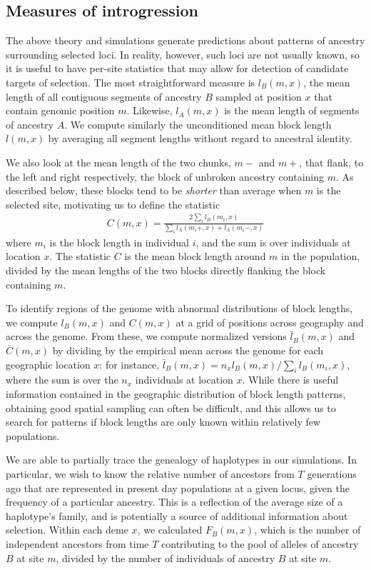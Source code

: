 \documentclass[11pt,letterpaper]{article}
\begin{document}
\subsection*{Measures of introgression}


The above theory and simulations generate predictions about patterns of ancestry surrounding selected loci. 
In reality, however, such loci are not usually known, so it is useful to have per-site statistics that may allow for detection of candidate targets of selection. 
The most straightforward measure is $l_B(m,x)$,  
the mean length of all contiguous segments of ancestry $B$ sampled at position $x$ that contain genomic position $m$.
Likewise, $l_A(m,x)$ is the mean length of segments of ancestry $A$.
We compute similarly the unconditioned mean block length $l(m,x)$
by averaging all segment lengths without regard to ancestral identity.

We also look at the mean length of the two chunks, $m-$ and $m+$, that flank, to the left and right respectively, 
the block of unbroken ancestry containing $m$. 
As described below, these blocks tend to be \emph{shorter} than average when $m$ is the selected site,
motivating us to define the statistic
\begin{align}
     C(m,x) =  \frac{2\sum_i{l_B(m_i,x)}}{\sum_i{l_A(m_i+,x)+l_A(m_i-,x)}}
\end{align}
where $m_i$ is the block length in individual $i$, and the sum is over individuals at location $x$.
The statistic $C$ is the mean block length around $m$ in the population, 
divided by the mean lengths of the two blocks directly flanking the block containing $m$. 

To identify regions of the genome with abnormal distributions of block lengths, 
we compute $l_B(m,x)$ and $C(m,x)$ at a grid of positions across geography and across the genome. 
From these, we compute normalized versions $\bar l_B(m,x)$ and $\bar C(m,x)$
by dividing by the empirical mean across the genome for each geographic location $x$:
for instance, $\bar l_B(m,x) = n_x l_B(m,x)/\sum_i l_B(m_i,x)$,
where the sum is over the $n_x$ individuals at location $x$.
While there is useful information contained in the geographic distribution of block length patterns, 
obtaining good spatial sampling can often be difficult, 
and this allows us to search for patterns if block lengths are only known within relatively few populations. 

We are able to partially trace the genealogy of haplotypes in our simulations. 
In particular, we wish to know the relative number of ancestors from $T$ generations ago that are represented in present day populations at a given locus, given the frequency of a particular ancestry. 
This is a reflection of the average size of a haplotype's family, 
and is potentially a source of additional information about selection. 
Within each deme $x$, we calculated $F_B(m,x)$, which is the number of independent ancestors from time $T$ contributing to the pool of alleles of ancestry $B$ at site $m$, 
divided by the number of individuals of ancestry $B$ at site $m$.
\end{document}
